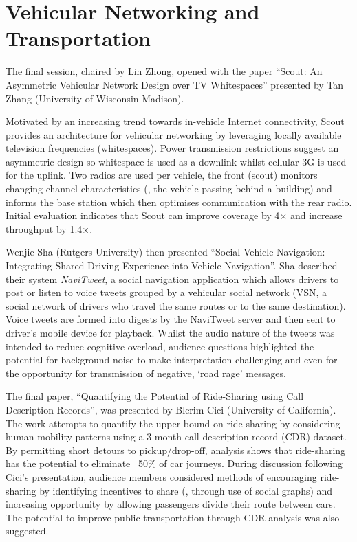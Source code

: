 \section{Vehicular Networking and Transportation}
\label{sec:vehiclenets}
The final session, chaired by Lin Zhong, opened with the paper ``Scout: An 
Asymmetric Vehicular Network Design over TV Whitespaces'' presented by Tan Zhang 
(University of Wisconsin-Madison).

Motivated by an increasing trend towards in-vehicle Internet connectivity, Scout 
provides an architecture for vehicular networking by leveraging locally available 
television frequencies (whitespaces). Power transmission restrictions suggest an 
asymmetric design so whitespace is used as a downlink whilst cellular 3G is 
used for the uplink. Two radios are used per vehicle, the front (scout) 
monitors changing channel characteristics (\eg{}, the vehicle passing behind a 
building) and informs the base station which then optimises communication with 
the rear radio. Initial evaluation indicates that Scout can improve coverage by 
4$\times$ and increase throughput by 1.4$\times$.

Wenjie Sha (Rutgers University) then presented ``Social Vehicle Navigation: 
Integrating Shared Driving Experience into Vehicle Navigation''. Sha described 
their system \emph{NaviTweet}, a social navigation application which allows drivers 
to post or listen to voice tweets grouped by a vehicular social 
network (VSN, a social network of drivers who travel the same routes or to the 
same destination). Voice tweets are formed into digests by the 
NaviTweet server and then sent to driver's mobile device for playback.
Whilst the audio nature of the tweets 
was intended to reduce cognitive overload, audience questions highlighted the 
potential for background noise to make interpretation challenging and even for 
the opportunity for transmission of negative, `road rage' messages.

The final paper, ``Quantifying the Potential of Ride-Sharing using Call 
Description Records'', was presented by Blerim Cici (University of California). 
The work attempts to quantify the upper bound on ride-sharing 
by considering human mobility patterns using a 
3-month call description record (CDR) dataset.
By permitting short detours to pickup\slash drop-off,
analysis shows that ride-sharing has the potential to eliminate ~50\% of car 
journeys. During discussion following Cici's presentation, audience members
considered methods of encouraging ride-sharing by identifying incentives to
share (\eg{}, through use of social graphs) and increasing opportunity by 
allowing passengers divide their route between cars. The potential to
improve public transportation through CDR analysis was also suggested.
